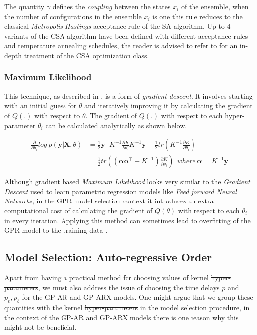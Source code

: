 \documentclass{article}
\providecommand{\DIFadd}[1]{{\protect\color{blue}\uwave{#1}}} %
\providecommand{\DIFdel}[1]{{\protect\color{red}\sout{#1}}}                      %
\providecommand{\DIFaddbegin}{} %
\providecommand{\DIFaddend}{} %
\providecommand{\DIFdelbegin}{} %
\providecommand{\DIFdelend}{} %
\newcommand{\DIFscaledelfig}{0.5}
\newlength{\DIFdelgraphicswidth} %
\newlength{\DIFdelgraphicsheight} %
\newcommand{\DIFaddincludegraphics}[2][]{{\color{blue}\fbox{\DIFOincludegraphics[#1]{#2}}}} %
\newcommand{\DIFdelincludegraphics}[2][]{%
\sbox{\DIFdelgraphicsbox}{\DIFOincludegraphics[#1]{#2}}%
\settoboxwidth{\DIFdelgraphicswidth}{\DIFdelgraphicsbox} %
\settoboxtotalheight{\DIFdelgraphicsheight}{\DIFdelgraphicsbox} %
\scalebox{\DIFscaledelfig}{%
\parbox[b]{\DIFdelgraphicswidth}{\usebox{\DIFdelgraphicsbox}\\[-\baselineskip] \rule{\DIFdelgraphicswidth}{0em}}\llap{\resizebox{\DIFdelgraphicswidth}{\DIFdelgraphicsheight}{%
\setlength{\unitlength}{\DIFdelgraphicswidth}%
\begin{picture}(1,1)%
\thicklines\linethickness{2pt} %
{\color[rgb]{1,0,0}\put(0,0){\framebox(1,1){}}}%
{\color[rgb]{1,0,0}\put(0,0){\line( 1,1){1}}}%
{\color[rgb]{1,0,0}\put(0,1){\line(1,-1){1}}}%
\end{picture}%
}\hspace*{3pt}}} %
} %
\DeclareRobustCommand{\DIFaddbegin}{\DIFOaddbegin \let\includegraphics\DIFaddincludegraphics} %
\DeclareRobustCommand{\DIFaddend}{\DIFOaddend \let\includegraphics\DIFOincludegraphics} %
\DeclareRobustCommand{\DIFdelbegin}{\DIFOdelbegin \let\includegraphics\DIFdelincludegraphics} %
\DeclareRobustCommand{\DIFdelend}{\DIFOaddend \let\includegraphics\DIFOincludegraphics} %
\begin{document}
The quantity $\gamma$ defines the \emph{coupling} between the states ${x_i}$ of the ensemble, when the number of configurations in the ensemble $x_i$ is one this rule reduces to the classical \emph{Metropolis-Hastings} acceptance rule of the SA algorithm. Up to 4 variants of the CSA algorithm have been defined with different acceptance rules and temperature annealing schedules, the reader is advised to refer to \citet{Xavier-De-Souza2010} for an in-depth treatment of the CSA optimization class.  

\subsubsection*{Maximum Likelihood} 

This technique, as described in \citet{Rasmussen:2005:GPM:1162254}, is a form of \emph{gradient descent}. It involves starting with an initial guess for $\theta$ and iteratively improving it by calculating the gradient of $Q(.)$ with respect to $\theta$. The gradient of $Q(.)$ with respect to each hyper-parameter $\theta_i$ can be calculated analytically as shown below.

\begin{align*}
\frac{\partial}{\partial \theta_i} log \ p(\mathbf{y}|\mathbf{X}, \theta) & = \frac{1}{2} \mathbf{y}^\intercal K^{-1} \frac{\partial K}{\partial \theta_i} K^{-1} \mathbf{y}  - \frac{1}{2} tr(K^{-1} \frac{\partial K}{\partial \theta_i})\\
 & = \frac{1}{2} tr((\mathbf{\alpha}\mathbf{\alpha}^\intercal - K^{-1}) \frac{\partial K}{\partial \theta_i}) \ \ where \ \mathbf{\alpha} = K^{-1} \mathbf{y}
\end{align*}


Although gradient based \emph{Maximum Likelihood} looks very similar to the \emph{Gradient Descent} used to learn parametric regression models like \emph{Feed forward Neural Networks}, in the GPR model selection context it introduces an extra computational cost of calculating the gradient of $Q(\theta)$ with respect to each $\theta_i$ in every iteration. Applying this method can sometimes lead to overfitting of the GPR model to the training data \citep{Rasmussen:2005:GPM:1162254}.

\subsection{Model Selection: Auto-regressive Order}

Apart from having a practical method for choosing values of kernel \DIFdelbegin \DIFdel{hyper-parameters}\DIFdelend \DIFaddbegin \DIFadd{hyperparameters}\DIFaddend , we must also address the issue of choosing the time delays $p$ and $p_v, p_b$ for the GP-AR and GP-ARX models. One might argue that we group these quantities with the kernel \DIFdelbegin \DIFdel{hyper-parameters }\DIFdelend \DIFaddbegin \DIFadd{hyperparameters }\DIFaddend in the model selection procedure, in the context of the GP-AR and GP-ARX models there is one reason why this might not be beneficial. 
\end{document}
